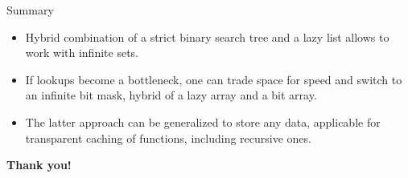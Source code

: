 \documentclass[handout]{beamer}
\begin{document}
\begin{frame}{Summary}

\begin{itemize}
\item Hybrid combination of a strict binary search tree and a lazy list
      allows to work with infinite sets.
\pause
\item If lookups become a bottleneck, one can trade space for speed
      and switch to an infinite bit mask,
      hybrid of a lazy array and a bit array.
\pause
\item The latter approach can be generalized to store any data, applicable
      for transparent caching of functions, including recursive ones.
\end{itemize}

\bigskip
\bigskip

\pause
\centerline{\Huge\bf Thank you!}
\end{frame}
\end{document}
